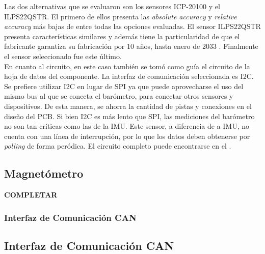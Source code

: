 Las dos alternativas que se evaluaron son los sensores ICP-20100 y el ILPS22QSTR. El primero de ellos presenta las \textit{absolute accuracy} y \textit{relative accuracy} más bajas de entre todas las opciones evaluadas. El sensor ILPS22QSTR presenta características similares y además tiene la particularidad de que el fabricante garantiza su fabricación por 10 años, hasta enero de 2033 \cite{baro_5}. Finalmente el sensor seleccionado fue este último.\\

En cuanto al circuito, en este caso también se tomó como guía el circuito de la hoja de datos del componente. La interfaz de comunicación seleccionada es I2C. Se prefiere utilizar I2C en lugar de SPI ya que puede aprovecharse el uso del mismo bus al que se conecta el barómetro, para conectar otros sensores y dispositivos. De esta manera, se ahorra la cantidad de pistas y conexiones en el diseño del PCB. Si bien I2C es más lento que SPI, las mediciones del barómetro no son tan críticas como las de la IMU. Este sensor, a diferencia de a IMU, no cuenta con una línea de interrupción, por lo que los datos deben obtenerse por \textit{polling} de forma peródica. El circuito completo puede encontrarse en el .

\subsection{Magnetómetro}

\textbf{{\color{red} COMPLETAR}}

\subsubsection{Interfaz de Comunicación CAN}
\subsection{Interfaz de Comunicación CAN}


